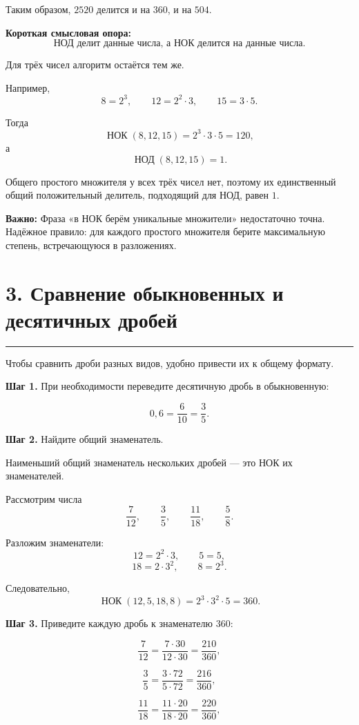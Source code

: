 \documentclass[a4paper,12pt]{article}
\newcommand{\sectionline}{
  \par
  \vspace{-0.35em}
  {\color{accent}\rule{\linewidth}{0.5pt}}
  \vspace{0.55em}
}
\newcommand{\skill}[1]{\textbf{\color{darkaccent}#1}}
\newcommand{\warn}[1]{\textbf{Важно:} #1}
\newcommand{\nodmath}{
  \mathop{\mbox{НОД}}\nolimits
}
\newcommand{\nokmath}{
  \mathop{\mbox{НОК}}\nolimits
}
\begin{document}
Таким образом, $2520$ делится и на $360$, и на $504$.

\skill{Короткая смысловая опора:}
\[
\boxed{
\text{НОД делит данные числа, а НОК делится на данные числа.}
}
\]

Для трёх чисел алгоритм остаётся тем же.

Например,
\[
8=2^3,
\qquad
12=2^2\cdot 3,
\qquad
15=3\cdot 5.
\]

Тогда
\[
\nokmath(8,12,15)
=
2^3\cdot 3\cdot 5
=
120,
\]
а
\[
\nodmath(8,12,15)=1.
\]

Общего простого множителя у всех трёх чисел нет,
поэтому их единственный общий положительный делитель,
подходящий для НОД, равен $1$.

\warn{Фраза «в НОК берём уникальные множители» недостаточно точна.}
Надёжное правило: для каждого простого множителя
берите максимальную степень, встречающуюся в разложениях.


\section*{3. Сравнение обыкновенных и десятичных дробей}
\sectionline

Чтобы сравнить дроби разных видов, удобно привести их
к общему формату.

\skill{Шаг 1.}
При необходимости переведите десятичную дробь
в обыкновенную:

\[
0,6
=
\frac{6}{10}
=
\frac35.
\]

\skill{Шаг 2.}
Найдите общий знаменатель.

Наименьший общий знаменатель нескольких дробей ---
это НОК их знаменателей.

Рассмотрим числа
\[
\frac7{12},
\qquad
\frac35,
\qquad
\frac{11}{18},
\qquad
\frac58.
\]

Разложим знаменатели:
\[
12=2^2\cdot 3,
\qquad
5=5,
\]
\[
18=2\cdot 3^2,
\qquad
8=2^3.
\]

Следовательно,
\[
\nokmath(12,5,18,8)
=
2^3\cdot 3^2\cdot 5
=
360.
\]

\skill{Шаг 3.}
Приведите каждую дробь к знаменателю $360$:

\[
\frac7{12}
=
\frac{7\cdot 30}{12\cdot 30}
=
\frac{210}{360},
\]

\[
\frac35
=
\frac{3\cdot 72}{5\cdot 72}
=
\frac{216}{360},
\]

\[
\frac{11}{18}
=
\frac{11\cdot 20}{18\cdot 20}
=
\frac{220}{360},
\]
\end{document}
